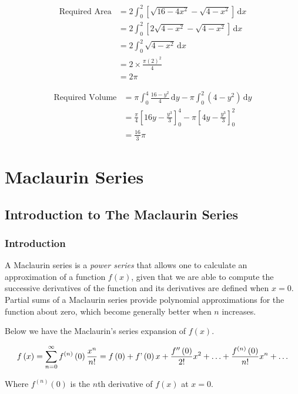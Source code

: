 \documentclass[11pt,a4paper]{book}
\begin{document}
\begin{example}
\begin{align*}
\text{Required Area} & =2\int_{0}^{2}\left[\sqrt{16-4x^{2}}-\sqrt{4-x^{2}}\right]\,\mathrm{d}x\\
 & =2\int_{0}^{2}\left[2\sqrt{4-x^{2}}-\sqrt{4-x^{2}}\right]\,\mathrm{d}x\\
 & =2\int_{0}^{2}\sqrt{4-x^{2}}\,\mathrm{d}x\\
 & =2\times\frac{\pi\left(2\right)^{2}}{4}\\
 & =2\pi
\end{align*}

\begin{align*}
\text{Required Volume} & =\pi\int_{0}^{4}\frac{16-y^{2}}{4}\,\mathrm{d}y-\pi\int_{0}^{2}\left(4-y^{2}\right)\,\mathrm{d}y\\
 & =\frac{\pi}{4}\left[16y-\frac{y^{3}}{3}\right]_{0}^{4}-\pi\left[4y-\frac{y^{3}}{3}\right]_{0}^{2}\\
 & =\frac{16}{3}\pi
\end{align*}
\end{example}


\chapter{Maclaurin Series}

\section{Introduction to The Maclaurin Series}

\subsection{Introduction}

A Maclaurin series is a \textit{power series} that allows one to calculate
an approximation of a function $f\left(x\right)$, given that we are
able to compute the successive derivatives of the function and its
derivatives are defined when $x=0$. Partial sums of a Maclaurin series
provide polynomial approximations for the function about zero, which
become generally better when $n$ increases.

\begin{tcolorbox}[colback=blue!5, colframe=black, boxrule=.4pt, sharpish corners]

Below we have the Maclaurin's series expansion of $f\left(x\right)$.

\[
f\left(x\right)=\sum\limits _{n=0}^{\infty}f^{\left(n\right)}\left(0\right)\frac{x^{n}}{n!}=f\left(0\right)+f\text{\textquoteright}\left(0\right)x+\frac{f^{\prime\prime}\left(0\right)}{2!}x^{2}+\ldots+\frac{f^{\left(n\right)}\left(0\right)}{n!}x^{n}+\ldots
\]

Where $f^{\left(n\right)}\left(0\right)$ is the $n$th derivative
of $f\left(x\right)$ at $x=0$.
\end{tcolorbox}
\end{document}
